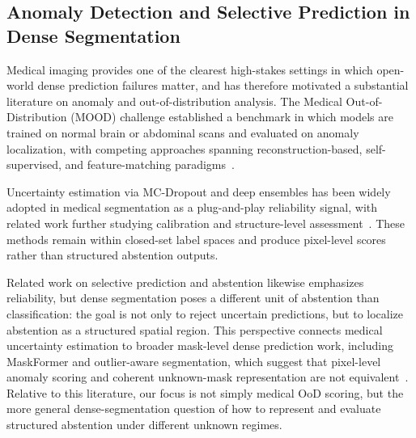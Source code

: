 \documentclass[journal]{IEEEtai}
\begin{document}
\subsection{Anomaly Detection and Selective Prediction in Dense Segmentation}
\label{sec:rw-med-ood}

Medical imaging provides one of the clearest high-stakes settings in which open-world
dense prediction failures matter, and has therefore motivated a substantial literature
on anomaly and out-of-distribution analysis. The Medical Out-of-Distribution (MOOD)
challenge established a benchmark in which models are trained on normal brain or
abdominal scans and evaluated on anomaly localization, with competing approaches
spanning reconstruction-based, self-supervised, and feature-matching
paradigms~\cite{zimmerer2022mood2020,baur2021autoencodersunsupervised,bengs2021threedimensional,rashmi2024anoswinmae}.

Uncertainty estimation via MC-Dropout and deep ensembles has been widely adopted in
medical segmentation as a plug-and-play reliability signal, with related work further
studying calibration and structure-level assessment~\cite{lambert2022trustworthyclinical,musah2025towardstrustworthy,wang2022uncertaintyguided,karimi2023improvingcalibration}.
These methods remain within closed-set label spaces and produce pixel-level scores
rather than structured abstention outputs.

Related work on selective prediction and abstention likewise emphasizes reliability,
but dense segmentation poses a different unit of abstention than classification: the
goal is not only to reject uncertain predictions, but to localize abstention as a
structured spatial region. This perspective connects medical uncertainty estimation to
broader mask-level dense prediction work, including MaskFormer and outlier-aware
segmentation, which suggest that pixel-level anomaly scoring and coherent unknown-mask
representation are not equivalent~\cite{geifman2019selectivenetdeep,kompa2021secondopinion,cheng2021perpixel,grcic2023advantagesmask}.
Relative to this literature, our focus is not simply medical OoD scoring, but the
more general dense-segmentation question of how to represent and evaluate structured
abstention under different unknown regimes.
\end{document}
